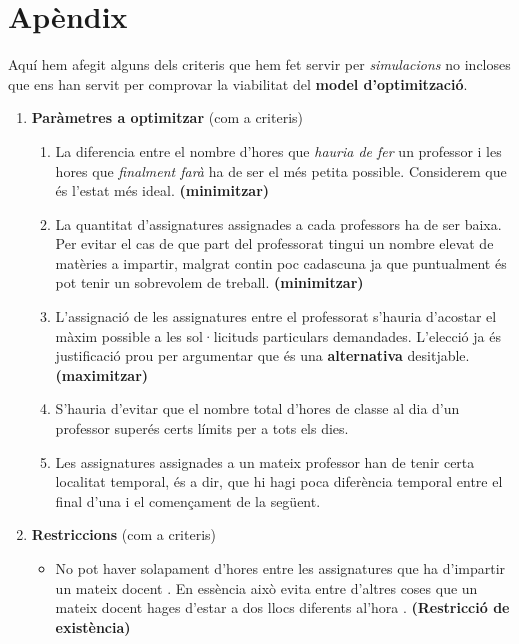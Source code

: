 \documentclass[10pt,twocolumn]{article}
\begin{document}
\section*{Apèndix}
Aquí hem afegit alguns dels criteris que hem fet servir per \textit{simulacions} no incloses que ens han servit per comprovar la viabilitat del \textbf{model d'optimització}. 
\begin{enumerate}
	\item \textbf{Paràmetres a optimitzar } (com a criteris) 
	\begin{enumerate}
		\item La diferencia entre el nombre d'hores que \textit{hauria de fer} un professor i les hores que \textit{finalment farà} ha de ser el més petita possible. {\color{gray} Considerem que és l'estat més ideal.} \textbf{(minimitzar)} 
		\item La quantitat d'assignatures assignades a cada professors ha de ser baixa. 
		{\color{gray}  Per evitar el cas de que part del professorat tingui un nombre elevat de matèries a impartir, malgrat contin poc cadascuna ja que puntualment és pot tenir un sobrevolem de treball.} \textbf{(minimitzar)}
		\item L'assignació de les assignatures entre el professorat s'hauria d'acostar el màxim possible a les sol·licituds particulars demandades. {\color{gray}  L'elecció ja és justificació prou per argumentar que és una \textbf{alternativa} desitjable.} \textbf{(maximitzar)}
		\item S'hauria d'evitar que el nombre total d'hores de classe al dia d'un professor superés certs límits per a tots els dies.
		\item Les assignatures assignades a un mateix professor han de tenir certa localitat temporal, és a dir, que hi hagi poca diferència temporal entre el final d'una i el començament de la següent.
	\end{enumerate}
	\item \textbf{Restriccions} (com a criteris)
	\begin{itemize}
		\item No pot haver solapament d'hores entre les assignatures que ha d'impartir un mateix docent . {\color{gray} En essència això evita entre d'altres coses que un mateix docent hages d'estar a dos llocs diferents al'hora .} \textbf{(Restricció de existència)} 

\end{itemize}
\end{enumerate}
\end{document}
